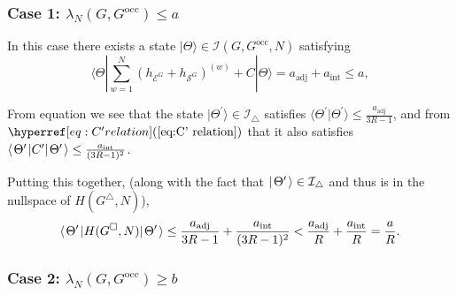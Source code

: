 \documentclass[../thesis-main/thesis-main]{subfiles}
\begin{document}
\subsubsection*{Case 1: $\lambda_{N}(G,G^{\text{occ}})\leq a$}

In this case there exists a state $|\Theta\rangle\in\mathcal{I}(G,G^{\text{occ}},N)$ satisfying 
\begin{equation}
\langle\Theta|\sum_{w=1}^{N}\left(h_{\mathcal{E}^{G}}+h_{\mathcal{S}^{G}}\right)^{(w)} + C|\Theta\rangle = a_{\text{adj}} + a_\text{int}\leq a,
\end{equation}

From equation  we see that the state $|\Theta^{\prime}\rangle\in\mathcal{I}_{\triangle}$ satisfies $\langle\Theta^{\prime}|\Theta^{\prime}\rangle\leq\frac{a_{\text{adj}}}{3R-1}$, and from $\eq{C' relation}$ that it also satisfies $\langle\mspace{2mu} \Theta' \mspace{2mu} | C' |\mspace{2mu} \Theta' \mspace{2mu} \rangle \leq \frac{a_{\text{int}}}{(3R-1)^2}$.

Putting this together, (along with the fact that $|\mspace{2mu} \Theta' \mspace{2mu} \rangle\in \mathcal{I}_{\triangle}$ and thus is in the nullspace of $H(G^{\triangle},N)$),
\begin{equation}
  \langle\mspace{2mu} \Theta' \mspace{2mu} |H(G^{\square},N) |\mspace{2mu} \Theta' \mspace{2mu} \rangle \leq \frac{a_{\text{adj}}}{3R-1} + \frac{a_{\text{int}}}{(3R-1)^2} < \frac{a_{\text{adj}}}{R} + \frac{a_{\text{int}}}{R} = \frac{a}{R}.
\end{equation}

\subsubsection*{Case 2: $\lambda_{N}(G,G^{\text{occ}})\geq b$}
\end{document}
